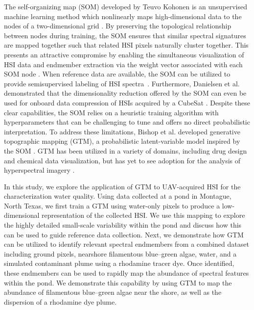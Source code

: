 The self-organizing map (SOM) developed by Teuvo Kohonen is an unsupervised machine learning method which nonlinearly maps high-dimensional data to the nodes of a two-dimensional grid \cite{kohonen-som-1}. By preserving the topological relationship between nodes during training, the SOM ensures that similar spectral signatures are mapped together such that related HSI pixels naturally cluster together. This presents an attractive compromise by enabling the simultaneous visualization of HSI data and endmember extraction via the weight vector associated with each SOM node \cite{cantero2004analysis, duran2007time,som-hsi}. When reference data are available, the SOM can be utilized to provide semisupervised labeling of HSI spectra~\cite{riese2019supervised}. Furthermore, Danielsen et al. demonstrated that the dimensionality reduction offered by the SOM can even be used for onboard data compression of HSIs acquired by a CubeSat \cite{danielsen2021self}. Despite these clear capabilities, the SOM relies on a heuristic training algorithm with hyperparameters that can be challenging to tune and offers no direct probabilistic interpretation. To address these limitations, Bishop et al. developed  generative topographic mapping (GTM), a probabilistic latent-variable model inspired by the SOM \cite{gtm-orig}.  GTM has been utilized in a variety of domains, including drug design and chemical data visualization, but has yet to see adoption for the analysis of hyperspectral imagery \cite{kireeva2012generative, gaspar2015chemical, horvath2019generative}.

In this study, we explore the application of  GTM to UAV-acquired HSI for the characterization water quality. Using data collected at a pond in Montague, North Texas, we first train a GTM using water-only pixels to produce a low-dimensional representation of the collected HSI. We use this mapping to explore the highly detailed small-scale variability within the pond and discuss how this can be used to guide reference data collection. Next, we demonstrate how  GTM can be utilized to identify relevant spectral endmembers from a combined dataset including ground pixels, nearshore filamentous blue--green algae, water, and a simulated contaminant plume using a rhodamine tracer dye. Once identified, these endmembers can be used to rapidly map the abundance of spectral features within the pond. We demonstrate this capability by using  GTM to map the abundance of filamentous blue--green algae near the shore, as well as the dispersion of a rhodamine dye plume.



